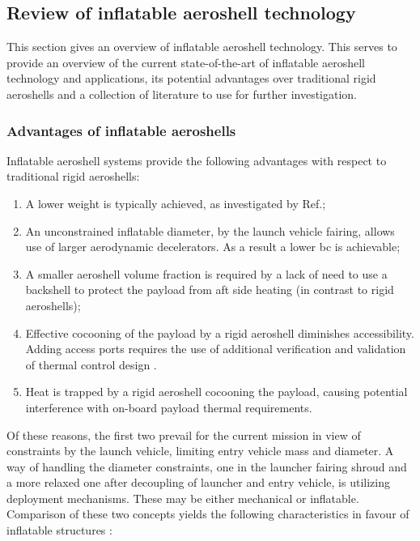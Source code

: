 \subsection{Review of inflatable aeroshell technology}\label{sec:aeroshells}
This section gives an overview of inflatable aeroshell technology. This serves to provide an overview of the current state-of-the-art of inflatable aeroshell technology and applications, its potential advantages over traditional rigid aeroshells and a collection of literature to use for further investigation.

\subsubsection{Advantages of inflatable aeroshells}
Inflatable aeroshell systems provide the following advantages with respect to traditional rigid aeroshells: \cite{Cassapakis1995, Hughes2005} 
\begin{enumerate}
\item A lower weight is typically achieved, as investigated by Ref.\cite{Cianciolo2010};
\item An unconstrained inflatable diameter, by the launch vehicle fairing, allows use of larger aerodynamic decelerators. As a result a lower \gls{bc} is achievable;
\item A smaller aeroshell volume fraction is required by a lack of need to use a backshell to protect the payload from aft side heating (in contrast to rigid aeroshells);
\item Effective cocooning of the payload by a rigid aeroshell diminishes accessibility. Adding access ports requires the use of additional verification and validation of thermal control design \cite{Johnson1997}.
\item Heat is trapped by a rigid aeroshell cocooning the payload, causing potential interference with on-board payload thermal requirements.
\end{enumerate}
Of these reasons, the first two prevail for the current mission in view of constraints by the launch vehicle, limiting entry vehicle mass and diameter. A way of handling the diameter constraints, one in the launcher fairing shroud and a more relaxed one after decoupling of launcher and entry vehicle, is utilizing deployment mechanisms. These may be either mechanical or inflatable. Comparison of these two concepts yields the following characteristics in favour of inflatable structures \cite{Cassapakis1995}:
